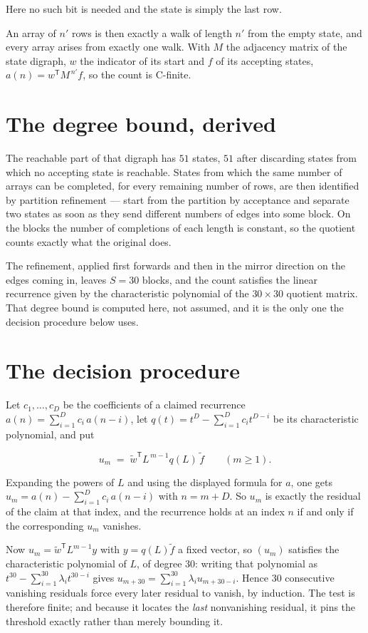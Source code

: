 \documentclass[11pt]{article}
\theoremstyle{definition}
\begin{document}
Here no such bit is needed and the state is simply the last row.

An array of $n'$ rows is then exactly a walk of length $n'$ from the empty state, and every array arises from exactly one walk. With $M$ the adjacency matrix of the state digraph, $w$ the indicator of its start and $f$ of its accepting states, $a(n) = w^{\mathsf T}M^{\,n'}f$, so the count is C-finite.

\section{The degree bound, derived}

The reachable part of that digraph has $51$ states, $51$ after discarding states from which no accepting state is reachable. States from which the same number of arrays can be completed, for every remaining number of rows, are then identified by partition refinement --- start from the partition by acceptance and separate two states as soon as they send different numbers of edges into some block. On the blocks the number of completions of each length is constant, so the quotient counts exactly what the original does.

The refinement, applied first forwards and then in the mirror direction on the edges coming in, leaves $S = 30$ blocks, and the count satisfies the linear recurrence given by the characteristic polynomial of the $30 \times 30$ quotient matrix. That degree bound is computed here, not assumed, and it is the only one the decision procedure below uses.

\section{The decision procedure}

Let $c_1,\dots,c_D$ be the coefficients of a claimed recurrence $a(n) = \sum_{i=1}^{D} c_i\,a(n-i)$, let $q(t) = t^{D} - \sum_{i=1}^{D} c_i t^{D-i}$ be its characteristic polynomial, and put

\[u_m \;=\; \tilde w^{\mathsf T} L^{\,m-1} q(L)\,\tilde f \qquad (m \ge 1).\]

Expanding the powers of $L$ and using the displayed formula for $a$, one gets $u_m = a(n) - \sum_{i=1}^{D} c_i\,a(n-i)$ with $n = m + D$. So $u_m$ is exactly the residual of the claim at that index, and the recurrence holds at an index $n$ if and only if the corresponding $u_m$ vanishes.

Now $u_m = \tilde w^{\mathsf T} L^{m-1} y$ with $y = q(L)\tilde f$ a fixed vector, so $(u_m)$ satisfies the characteristic polynomial of $L$, of degree $30$: writing that polynomial as $t^{30} - \sum_{i=1}^{30} \lambda_i t^{30-i}$ gives $u_{m+30} = \sum_{i=1}^{30} \lambda_i u_{m+30-i}$. Hence $30$ consecutive vanishing residuals force every later residual to vanish, by induction. The test is therefore finite; and because it locates the {\itshape last} nonvanishing residual, it pins the threshold exactly rather than merely bounding it.
\end{document}
